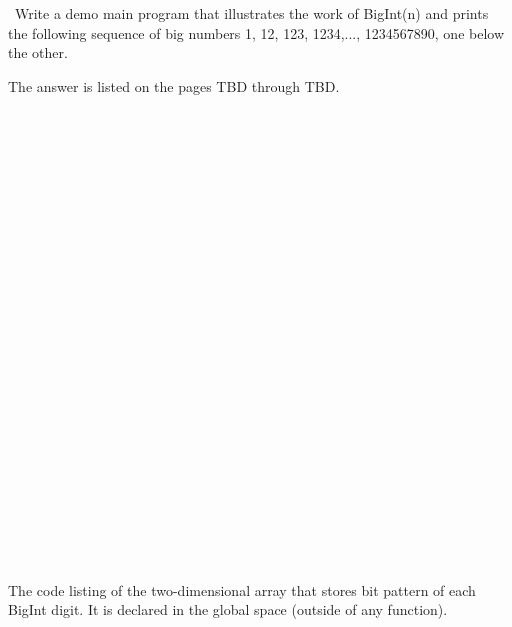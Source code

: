 \documentclass{article}
\begin{document}
	\rmfamily\
	Write a demo main program that illustrates the work of BigInt(n) and prints the following sequence of big numbers 1, 12, 123, 1234,..., 1234567890, one below the other.
	\newline
	
	The answer is listed on the pages TBD through TBD.
	
	
\paragraph{}\
\paragraph{}\
\paragraph{}\
\paragraph{}\
\paragraph{}\
\paragraph{}\
\paragraph{}\
\paragraph{}\
\paragraph{}\
\paragraph{}\
\paragraph{}\
\paragraph{}\

	
	\noindent The code listing of the two-dimensional array that stores bit pattern of each BigInt digit. It is declared in the global space (outside of any function).
	
\end{document}
